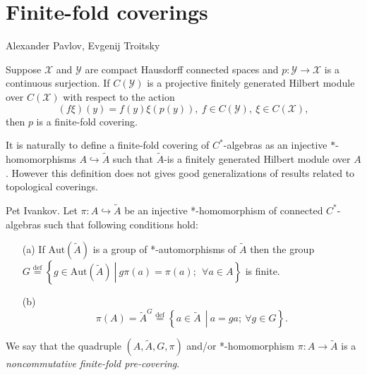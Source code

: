 \documentclass{beamer}
\theoremstyle{plain}
\newcommand{\be}{\begin{equation}}
\newcommand{\ee}{\end{equation}}
\newcommand{\Aut}{\mathrm{Aut}}
\newcommand{\bydef}{\stackrel{\mathrm{def}}{=}}
\newcommand{\hookto}{\hookrightarrow}        %
\begin{document}
\section{Finite-fold coverings}
 \begin{frame}
 	
 	\alert{Alexander Pavlov, Evgenij Troitsky}
 \begin{theorem}
 	Suppose $\mathcal X$ and $\mathcal Y$ are compact Hausdorff connected spaces and $p :\mathcal  Y \to \mathcal X$
 	is a continuous surjection. If $C(\mathcal Y )$ is a projective finitely generated Hilbert module over
 	$C(\mathcal X)$ with respect to the action
 	\begin{equation*}
 		(f\xi)(y) = f(y)\xi(p(y)), ~ f \in  C(\mathcal Y ), ~ \xi \in  C(\mathcal X),
 	\end{equation*}
 	then $p$ is a finite-fold  covering.
 \end{theorem}
  It is naturally to define a finite-fold covering of $C^*$-algebras as an injective $*$-homomorphisms $A\hookto \widetilde A$ such that $ \widetilde A$-is a finitely generated Hilbert module over
  $A$. However this definition does not gives good generalizations of results  related to topological coverings.
 
 \end{frame}
\begin{frame}
	   \begin{definition}\label{pre_defn} \alert{Pet Ivankov}.
	Let $\pi: A \hookto \widetilde{A}$ be an injective *-homomorphism of connected  $C^*$-algebras such that following conditions hold:
	\begin{enumerate}
		\item[(a)] If $\Aut\left(\widetilde{A} \right)$ is a group of *-automorphisms of $\widetilde{A}$ then the group  
		$
		G \bydef \left\{ \left.g \in \Aut\left(\widetilde{A} \right)~\right|~ g\pi\left( a\right)  = \pi\left( a\right) ;~~\forall a \in A\right\}
		$
		is finite.
		\item[(b)] 	\be\label{cond_b_eqn}
	\pi\left( 	A\right)  = \widetilde{A}^G\stackrel{\text{def}}{=}\left\{\left.a\in \widetilde{A}~~\right|~ a = g a;~ \forall g \in G\right\}.\ee
	\end{enumerate}
	We say that the quadruple $\left(A, \widetilde{A}, G, \pi \right)$ and/or *-homomorphism $\pi: A \to \widetilde{A}$   is a \textit{noncommutative finite-fold  pre-covering}. 
\end{definition}

\end{frame}
\end{document}
